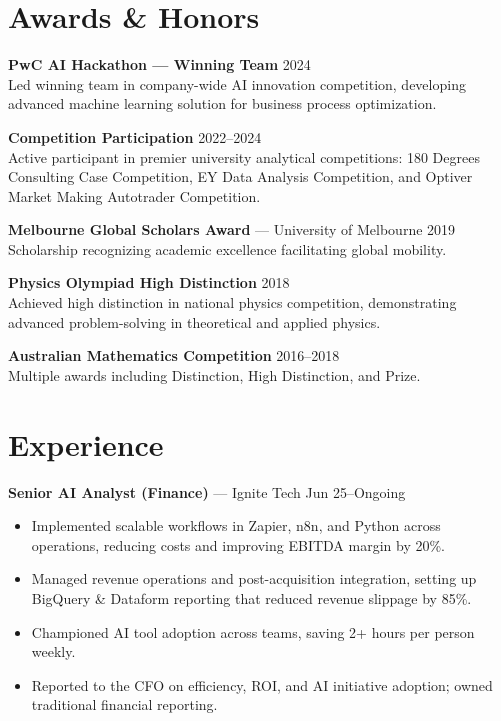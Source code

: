 \documentclass[10pt,letterpaper]{article}
\begin{document}
\section*{Awards \& Honors}

\textbf{PwC AI Hackathon — Winning Team} \hfill 2024\\
Led winning team in company-wide AI innovation competition, developing advanced machine learning solution for business process optimization.

\textbf{Competition Participation} \hfill 2022--2024\\
Active participant in premier university analytical competitions: 180 Degrees Consulting Case Competition, EY Data Analysis Competition, and Optiver Market Making Autotrader Competition.

\textbf{Melbourne Global Scholars Award} — University of Melbourne \hfill 2019\\
Scholarship recognizing academic excellence facilitating global mobility.

\textbf{Physics Olympiad High Distinction} \hfill 2018\\
Achieved high distinction in national physics competition, demonstrating advanced problem-solving in theoretical and applied physics.

\textbf{Australian Mathematics Competition} \hfill 2016--2018\\
Multiple awards including Distinction, High Distinction, and Prize.

\section*{Experience}

\textbf{Senior AI Analyst (Finance)} — Ignite Tech \hfill Jun 25--Ongoing\\[-1.5em]
\begin{itemize}
  \item Implemented scalable workflows in Zapier, n8n, and Python across operations, reducing costs and improving EBITDA margin by 20\%.
  \item Managed revenue operations and post-acquisition integration, setting up BigQuery \& Dataform reporting that reduced revenue slippage by 85\%.
  \item Championed AI tool adoption across teams, saving 2+ hours per person weekly.
  \item Reported to the CFO on efficiency, ROI, and AI initiative adoption; owned traditional financial reporting.
\end{itemize}
\end{document}
